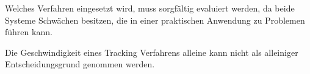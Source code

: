 Welches Verfahren eingesetzt wird, muss sorgfältig evaluiert werden, da beide Systeme Schwächen besitzen, die in einer praktischen Anwendung zu Problemen führen kann.

Die Geschwindigkeit eines Tracking Verfahrens alleine kann nicht als alleiniger Entscheidungsgrund genommen werden.



